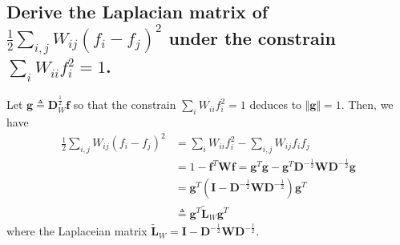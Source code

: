 \documentclass{article}
\begin{document}
\subsection{Derive the Laplacian matrix of $\frac{1}{2}\sum_{i,j} W_{ij}(f_i-f_j)^2$ under the constrain $\sum_{i}W_{ii}f_i^2 = 1$.}
Let $\mathbf{g} \triangleq \mathbf D_{W}^{\frac{1}{2}} \mathbf f$ so that the constrain $\sum_{i}W_{ii}f_i^2=1$ deduces to $\Vert \mathbf g \Vert = 1$. Then, we have
\begin{align*}
\frac{1}{2}\sum_{i,j} W_{ij}(f_i-f_j)^2 & = \sum_{i}W_{ii}f_i^2 - \sum_{i,j} W_{ij}f_if_j \\
& = 1 - \mathbf{f}^T \mathbf W \mathbf{f} = \mathbf g^T  \mathbf g - \mathbf g^T \mathbf D^{-\frac{1}{2}}\mathbf W\mathbf D^{-\frac{1}{2}} \mathbf g \\
&= \mathbf g^T (\mathbf I - \mathbf D^{-\frac{1}{2}}\mathbf W\mathbf D^{-\frac{1}{2}})\mathbf g^T \\
&\triangleq \mathbf g^T \mathbf{\tilde L}_W \mathbf g^T 
\end{align*}
where the Laplaceian matrix $\mathbf{\tilde L}_W = \mathbf I - \mathbf D^{-\frac{1}{2}}\mathbf W\mathbf D^{-\frac{1}{2}}$.
\end{document}
